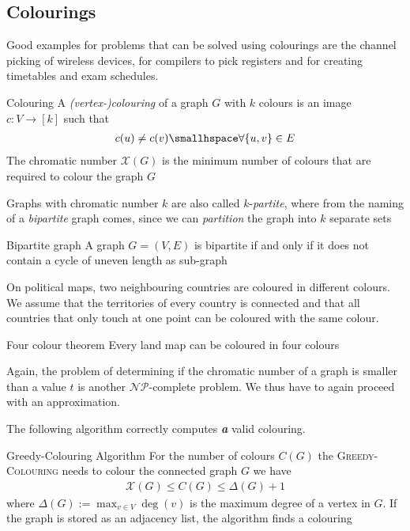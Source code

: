 \newpage
\subsection{Colourings}
Good examples for problems that can be solved using colourings are the channel picking of wireless devices, for compilers to pick registers and for creating timetables and exam schedules.

\begin{definition}[]{Colouring}
    A \textit{(vertex-)colouring} of a graph $G$ with $k$ colours is an image $c: V \rightarrow [k]$ such that
    \begin{align*}
        c(u) \neq c(v) \smallhspace \forall \{u, v\} \in E
    \end{align*}
    The chromatic number $\mathscr{X}(G)$ is the minimum number of colours that are required to colour the graph $G$
\end{definition}
Graphs with chromatic number $k$ are also called $k$-\textit{partite}, where from the naming of a \textit{bipartite} graph comes, since we can \textit{partition} the graph into $k$ separate sets
\begin{theorem}[]{Bipartite graph}
    A graph $G = (V, E)$ is bipartite if and only if it does not contain a cycle of uneven length as sub-graph
\end{theorem}
On political maps, two neighbouring countries are coloured in different colours.
We assume that the territories of every country is connected and that all countries that only touch at one point can be coloured with the same colour.
\begin{theorem}[]{Four colour theorem}
    Every land map can be coloured in four colours
\end{theorem}
Again, the problem of determining if the chromatic number of a graph is smaller than a value $t$ is another $\mathcal{N}\mathcal{P}$-complete problem. We thus have to again proceed with an approximation.

The following algorithm correctly computes \textit{\textbf{a}} valid colouring.
\begin{theorem}[]{Greedy-Colouring Algorithm}
    For the number of colours $C(G)$ the \textsc{Greedy-Colouring} needs to colour the connected graph $G$ we have
    \begin{align*}
        \mathscr{X}(G) \leq C(G) \leq \Delta(G) + 1
    \end{align*}
    where $\Delta(G) := \max_{v\in V}\deg(v)$ is the maximum degree of a vertex in $G$. If the graph is stored as an adjacency list, the algorithm finds a colouring 
\end{theorem}

